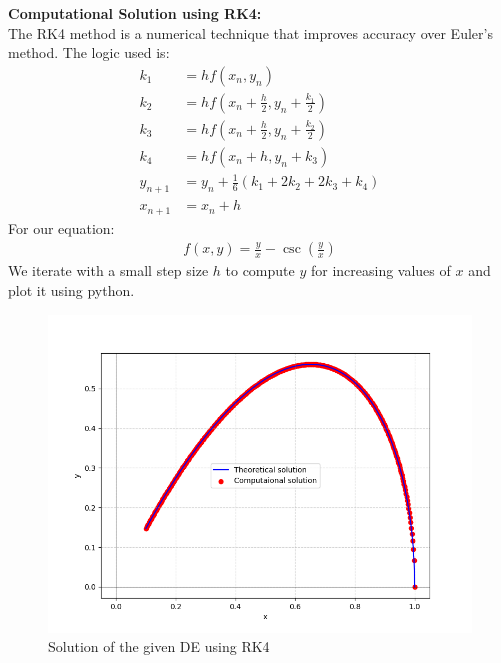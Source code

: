 \documentclass[journal]{IEEEtran}
\begin{document}
\textbf{Computational Solution using RK4:} \\
The RK4 method is a numerical technique that improves accuracy over Euler’s method. The  logic used is:
\begin{align}
    k_1 &= h f(x_n, y_n) \\
    k_2 &= h f\left(x_n + \frac{h}{2}, y_n + \frac{k_1}{2}\right) \\
    k_3 &= h f\left(x_n + \frac{h}{2}, y_n + \frac{k_2}{2}\right) \\
    k_4 &= h f\left(x_n + h, y_n + k_3\right) \\
    y_{n+1} &= y_n + \frac{1}{6} (k_1 + 2k_2 + 2k_3 + k_4) \\
    x_{n+1} &= x_n + h
\end{align}
For our equation:
\begin{align}
    f(x, y) = \frac{y}{x} - \csc{\left(\frac{y}{x}\right)}
\end{align}
We iterate with a small step size $h$ to compute $y$ for increasing values of $x$ and plot it using python.
\begin{figure}[!ht]
    \centering
    \includegraphics[width=\columnwidth]{figs/Figure_1.png}
    \caption{Solution of the given DE using RK4}
    \label{fig:rk4_solution}
\end{figure}
\end{document}
